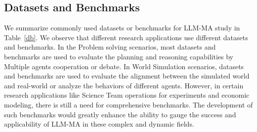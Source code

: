 \subsection{Datasets and Benchmarks} 
\label{Sec6:Datasets and Benchmarks}

We summarize commonly used datasets or benchmarks for LLM-MA study in Table~\ref{db}. We observe that different research applications use different datasets and benchmarks. In the Problem solving scenarios, most datasets and benchmarks are used to evaluate the planning and reasoning capabilities by Multiple agents cooperation or debate. In World Simulation scenarios, datasets and benchmarks are used to evaluate the alignment between the simulated world and real-world or analyze the behaviors of different agents. However, in certain research applications like Science Team operations for experiments and economic modeling, there is still a need for comprehensive benchmarks.   The development of such benchmarks would greatly enhance the ability to gauge the success and applicability of LLM-MA in these complex and dynamic fields.


